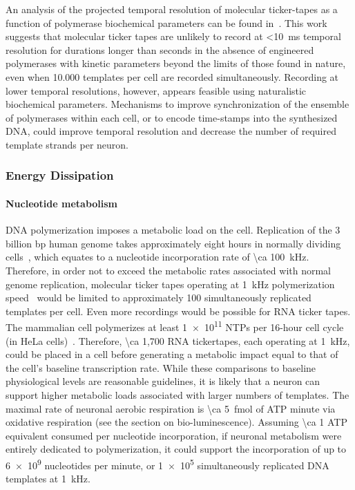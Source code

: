 An analysis of the projected temporal resolution of molecular ticker-tapes as a function of polymerase biochemical parameters can be found in~\cite{glaser13}.
This work suggests that molecular ticker tapes are unlikely to record at \SI{<10}{\ms} temporal resolution for durations longer than seconds in the absence of engineered polymerases with kinetic parameters beyond the limits of those found in nature, even when \num{10,000} templates per cell are recorded simultaneously.
Recording at lower temporal resolutions, however, appears feasible using naturalistic biochemical parameters.
Mechanisms to improve synchronization of the ensemble of polymerases within each cell, or to encode time-stamps into the synthesized DNA, could improve temporal resolution and decrease the number of required template strands per neuron.

\subsubsection{Energy Dissipation}
\paragraph{Nucleotide metabolism}
DNA polymerization imposes a metabolic load on the cell.
Replication of the 3 billion bp human genome takes approximately eight hours in normally dividing cells~\cite{murray12}, which equates to a nucleotide incorporation rate of \SI{\ca 100}{\kHz}.
Therefore, in order not to exceed the metabolic rates associated with normal genome replication, molecular ticker tapes operating at \SI{1}{\kHz} polymerization speed~\cite{kelman95} would be limited to approximately 100 simultaneously replicated templates per cell.
Even more recordings would be possible for RNA ticker tapes.
The mammalian cell polymerizes at least \num{1e11} NTPs per 16-hour cell cycle (in HeLa cells)~\cite{jackson00}.
Therefore, \num{\ca 1,700} RNA tickertapes, each operating at \SI{1}{\kHz}, could be placed in a cell before generating a metabolic impact equal to that of the cell's baseline transcription rate.
While these comparisons to baseline physiological levels are reasonable guidelines, it is likely that a neuron can support higher metabolic loads associated with larger numbers of templates.
The maximal rate of neuronal aerobic respiration is \SI{\ca 5}{\femto\mole} of ATP minute via oxidative respiration (see the section on bio-luminescence). Assuming \num{\ca 1} ATP equivalent consumed per nucleotide incorporation, if neuronal metabolism were entirely dedicated to polymerization, it could support the incorporation of up to \num{6e9} nucleotides per minute, or \num{1e5} simultaneously replicated DNA templates at \SI{1}{\kHz}. %

